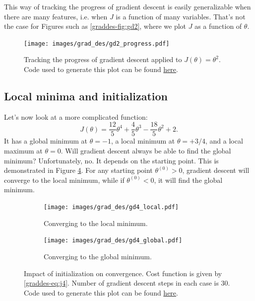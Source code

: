\documentclass{article}
\theoremstyle{definition}
\begin{document}
This way of tracking the progress of gradient descent is easily generalizable when there are many features, i.e. when $J$ is a function of many variables. That's not the case for Figures such as \ref{graddes-fig:gd2}, where we plot $J$ as a function of $\theta$.

\begin{figure}[ht]
\centering
\texttt{[image: images/grad\_des/gd2\_progress.pdf]}
\caption{Tracking the progress of gradient descent applied to  $J(\theta)=\theta^2$. Code used to generate this plot can be found \href{https://github.com/siavashaslanbeigi/ml_notes/blob/master/src/grad_des/basics.ipynb}{\color{blue} here}.}
\label{graddes-fig:gd2-progress}
\end{figure}


\subsection{Local minima and initialization}
Let's now look at a more complicated function:
\begin{equation}
   J(\theta) = \frac{12}{5} \theta^4 + \frac{4}{5} \theta^3 - \frac{18}{5} \theta^2 + 2.
   \label{graddes-eq:j4}
\end{equation}
It has a global minimum at $\theta=-1$, a local minimum at $\theta=+3/4$, and a local maximum at $\theta=0$. Will gradient descent always be able to find the global minimum? Unfortunately, no. It depends on the starting point. This is demonstrated in Figure \ref{graddes-fig:gd4-init}. For any starting point $\theta^{(0)}>0$, gradient descent will converge to the local minimum, while if $\theta^{(0)}<0$, it will find the global minimum.

\begin{figure}[ht]
    \begin{subfigure}{\linewidth}
        \centering
        \texttt{[image: images/grad\_des/gd4\_local.pdf]}
        \caption{Converging to the local minimum.}
        \label{graddes-fig:gd4-local}
    \end{subfigure}%
    
    \begin{subfigure}{\linewidth}
        \centering
        \texttt{[image: images/grad\_des/gd4\_global.pdf]}
        \caption{Converging to the global minimum.}
        \label{graddes-fig:gd4-global}
    \end{subfigure}%
    
    \caption{Impact of initialization on convergence. Cost function is given by \eqref{graddes-eq:j4}. Number of gradient descent steps in each case is 30. Code used to generate this plot can be found \href{https://github.com/siavashaslanbeigi/ml_notes/blob/master/src/grad_des/basics.ipynb}{\color{blue} here}.}
    \label{graddes-fig:gd4-init}
\end{figure}
\end{document}

